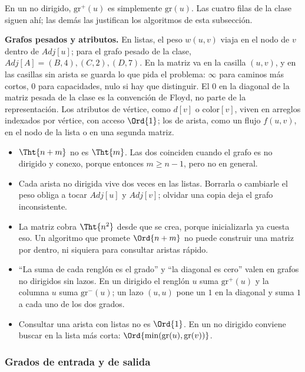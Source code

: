 \documentclass[11pt,letterpaper]{article}
\begin{document}
En un no dirigido, $\text{gr}^{+}(u)$ es simplemente $\text{gr}(u)$.
Las cuatro filas de la clase siguen ahí; las demás las justifican los
algoritmos de esta subsección.

\textbf{Grafos pesados y atributos.} En listas, el peso $w(u, v)$
viaja en el nodo de $v$ dentro de $\mathit{Adj}[u]$; para el grafo
pesado de la clase, $\mathit{Adj}[A] = (B, 4), (C, 2), (D, 7)$. En la
matriz va en la casilla $(u, v)$, y en las casillas sin arista se
guarda lo que pida el problema: $\infty$ para caminos más cortos, $0$
para capacidades, nulo si hay que distinguir. El $0$ en la diagonal
de la matriz pesada de la clase es la convención de Floyd, no parte de
la representación. Los atributos de vértice, como $d[v]$ o
$\text{color}[v]$, viven en arreglos indexados por vértice, con acceso
$\Ord{1}$; los de arista, como un flujo $f(u, v)$, en el nodo de la
lista o en una segunda matriz.

\begin{ojo}
  \begin{itemize}[leftmargin=1.2em, itemsep=0.15em]
    \item $\Tht{n + m}$ no es $\Tht{m}$. Las dos coinciden cuando el
      grafo es no dirigido y conexo, porque entonces $m \geq n - 1$,
      pero no en general.
    \item Cada arista no dirigida vive dos veces en las listas.
      Borrarla o cambiarle el peso obliga a tocar $\mathit{Adj}[u]$ y
      $\mathit{Adj}[v]$; olvidar una copia deja el grafo
      inconsistente.
    \item La matriz cobra $\Tht{n^2}$ desde que se crea, porque
      inicializarla ya cuesta eso. Un algoritmo que promete
      $\Ord{n + m}$ no puede construir una matriz por dentro, ni
      siquiera para consultar aristas rápido.
    \item ``La suma de cada renglón es el grado'' y ``la diagonal es
      cero'' valen en grafos no dirigidos sin lazos. En un dirigido
      el renglón $u$ suma $\text{gr}^{+}(u)$ y la columna $u$ suma
      $\text{gr}^{-}(u)$; un lazo $(u, u)$ pone un $1$ en la diagonal
      y suma $1$ a cada uno de los dos grados.
    \item Consultar una arista con listas no es $\Ord{1}$. En un no
      dirigido conviene buscar en la lista más corta:
      $\Ord{\min(\text{gr}(u), \text{gr}(v))}$.
  \end{itemize}
\end{ojo}

\subsubsection*{Grados de entrada y de salida}
\end{document}
